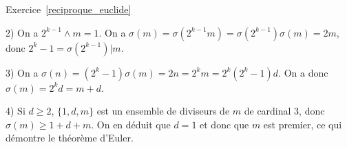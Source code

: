 \documentclass[11pt,a4paper]{article}
\begin{document}
Exercice~\ref{reciproque_euclide}



2) On a  $2^{k-1}\wedge m =1$. On a $\sigma(m)=\sigma(2^{k-1}m)=\sigma(2^{k-1})\sigma(m)=2m$, donc $2^k-1=\sigma(2^{k-1}) | m$. 

3) On a $\sigma(n)=(2^k-1)\sigma(m)=2n=2^km=2^k(2^k-1)d$. On a donc $\sigma(m)=2^kd=m+d$. 

4) Si $d\geq 2$, $\{1,d,m\}$ est un ensemble de diviseurs de $m$ de cardinal $3$, donc $\sigma(m)\geq 1+d+m$. On en déduit que $d=1$ et donc que $m$ est premier, ce qui démontre le théorème d'Euler.
\end{document}

